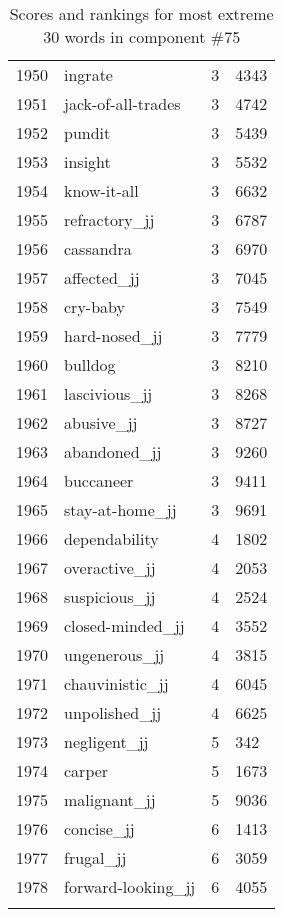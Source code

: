 \begin{longtable}[!htbp]{| rlr@{.}l |}
    1950 & ingrate & 3 & 4343 \\
    1951 & jack-of-all-trades & 3 & 4742 \\
    1952 & pundit & 3 & 5439 \\
    1953 & insight & 3 & 5532 \\
    1954 & know-it-all & 3 & 6632 \\
    1955 & refractory\_jj & 3 & 6787 \\
    1956 & cassandra & 3 & 6970 \\
    1957 & affected\_jj & 3 & 7045 \\
    1958 & cry-baby & 3 & 7549 \\
    1959 & hard-nosed\_jj & 3 & 7779 \\
    1960 & bulldog & 3 & 8210 \\
    1961 & lascivious\_jj & 3 & 8268 \\
    1962 & abusive\_jj & 3 & 8727 \\
    1963 & abandoned\_jj & 3 & 9260 \\
    1964 & buccaneer & 3 & 9411 \\
    1965 & stay-at-home\_jj & 3 & 9691 \\
    1966 & dependability & 4 & 1802 \\
    1967 & overactive\_jj & 4 & 2053 \\
    1968 & suspicious\_jj & 4 & 2524 \\
    1969 & closed-minded\_jj & 4 & 3552 \\
    1970 & ungenerous\_jj & 4 & 3815 \\
    1971 & chauvinistic\_jj & 4 & 6045 \\
    1972 & unpolished\_jj & 4 & 6625 \\
    1973 & negligent\_jj & 5 & 342 \\
    1974 & carper & 5 & 1673 \\
    1975 & malignant\_jj & 5 & 9036 \\
    1976 & concise\_jj & 6 & 1413 \\
    1977 & frugal\_jj & 6 & 3059 \\
    1978 & forward-looking\_jj & 6 & 4055 \\
    \hline
    \caption{Scores and rankings for most extreme 30 words in component \#75} \\
\end{longtable}
